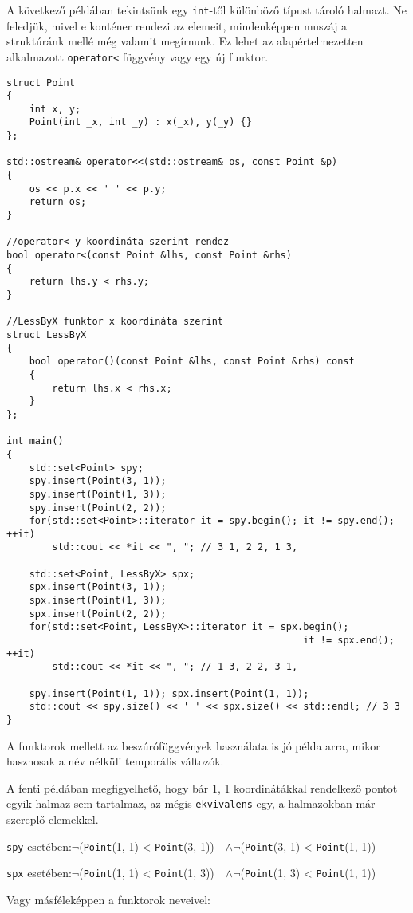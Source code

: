\documentclass[a4paper,11.5pt,table]{article}
\begin{document}
	\medskip
	A következő példában tekintsünk egy \texttt{int}-től különböző típust tároló halmazt. Ne feledjük, mivel e konténer rendezi az elemeit, mindenképpen muszáj a struktúránk mellé még valamit megírnunk. Ez lehet az alapértelmezetten alkalmazott \texttt{operator<} függvény vagy egy új funktor.
\begin{lstlisting}
struct Point
{
	int x, y;
	Point(int _x, int _y) : x(_x), y(_y) {}
};

std::ostream& operator<<(std::ostream& os, const Point &p)
{
	os << p.x << ' ' << p.y;
	return os;
}

//operator< y koordináta szerint rendez
bool operator<(const Point &lhs, const Point &rhs)
{
	return lhs.y < rhs.y;
}

//LessByX funktor x koordináta szerint
struct LessByX
{
	bool operator()(const Point &lhs, const Point &rhs) const
	{
		return lhs.x < rhs.x;
	}
};

int main()
{	
	std::set<Point> spy;
	spy.insert(Point(3, 1));
	spy.insert(Point(1, 3));
	spy.insert(Point(2, 2));
	for(std::set<Point>::iterator it = spy.begin(); it != spy.end(); ++it)
		std::cout << *it << ", "; // 3 1, 2 2, 1 3,
	
	std::set<Point, LessByX> spx;
	spx.insert(Point(3, 1));
	spx.insert(Point(1, 3));
	spx.insert(Point(2, 2));
	for(std::set<Point, LessByX>::iterator it = spx.begin(); 
												    it != spx.end(); ++it)
		std::cout << *it << ", "; // 1 3, 2 2, 3 1,
	
	spy.insert(Point(1, 1)); spx.insert(Point(1, 1));
	std::cout << spy.size() << ' ' << spx.size() << std::endl; // 3 3
}
\end{lstlisting}
	\begin{note}
		A funktorok mellett az beszúrófüggvények használata is jó példa arra, mikor hasznosak a név nélküli temporális változók.
	\end{note}
	A fenti példában megfigyelhető, hogy bár 1, 1 koordinátákkal rendelkező pontot egyik halmaz sem tartalmaz, az mégis \texttt{ekvivalens} egy, a halmazokban már szereplő elemekkel.
	
	\begin{center}	
		\texttt{spy} esetében:\quad  $\neg$\big(\texttt{Point}(1, 1) < \texttt{Point}(3, 1)\big) \,\, $\wedge$\quad $\neg$\big(\texttt{Point}(3, 1) < \texttt{Point}(1, 1)\big)
		
		\texttt{spx} esetében:\quad  $\neg$\big(\texttt{Point}(1, 1) < \texttt{Point}(1, 3)\big) \,\, $\wedge$\quad $\neg$\big(\texttt{Point}(1, 3) < \texttt{Point}(1, 1)\big)
	\end{center}
	Vagy másféleképpen a funktorok neveivel:
	
\end{document}
